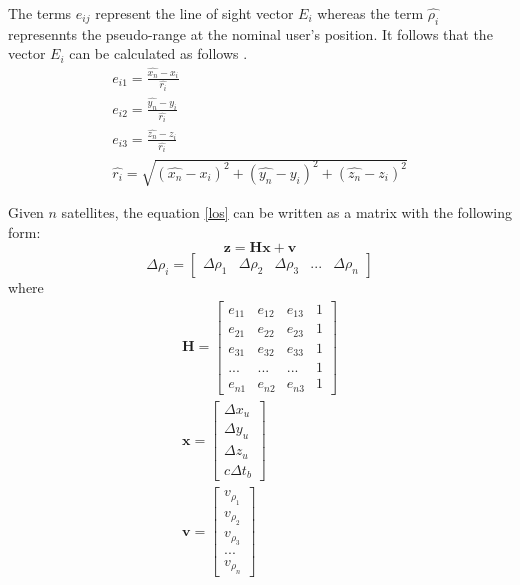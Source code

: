 The terms $e_{ij}$ represent the line of sight vector $E_i$ whereas the term $\hat{\rho_i}$ represennts the pseudo-range at the nominal user's position. It follows that the vector $E_i$ can be calculated as follows \cite{jwo2001efficient}.
\begin{subequations}
	\begin{align}
		e_{i1} = \frac{\hat{x_n} - x_i}{\hat{r_i}}\\
		e_{i2} = \frac{\hat{y_n} - y_i}{\hat{r_i}}\\
		e_{i3} = \frac{\hat{z_n} - z_i}{\hat{r_i}}\\
		\hat{r_i} = \sqrt{(\hat{x_n} - x_i)^2+(\hat{y_n} -y_i)^2+(\hat{z_n} -z_i)^2}
	\end{align}
\end{subequations}

Given $n$ satellites, the equation \eqref{los} can be written as a matrix with the following form:
\begin{equation}
	\textbf{z} = \textbf{Hx}+ \textbf{v}
\end{equation}
\begin{equation}
	\Delta \rho _i = \begin{bmatrix}
		\Delta \rho_1 &  \Delta \rho_2 &  \Delta \rho_3 & ... & \Delta \rho_n
	\end{bmatrix} 
\end{equation}
where 
\begin{subequations}
	\begin{align}
		\textbf{H} = \begin{bmatrix}
			e_{11} & e_{12} & e_{13}& 1 \\
			e_{21} & e_{22} & e_{23}& 1 
			\\
			e_{31} & e_{32} & e_{33}& 1
			\\
			... & ... & ... &  1 
			\\
			e_{n1} & e_{n2} & e_{n3} & 1
		\end{bmatrix}\\
		\textbf{x} = \begin{bmatrix}
			\Delta x_u \\ \Delta y_u \\\Delta z_u \\ c\Delta t_b
		\end{bmatrix}\\
		\textbf{v} = \begin{bmatrix}
			v_{\rho_1}\\
			v_{\rho_2}\\
			v_{\rho_3}\\
			...\\
			v_{\rho_n}
		\end{bmatrix}
	\end{align}
\end{subequations}

